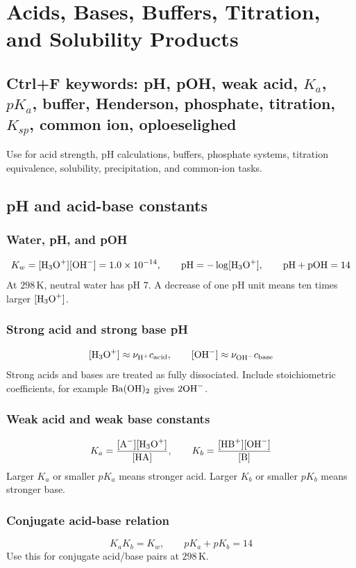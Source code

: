 \section{Acids, Bases, Buffers, Titration, and Solubility Products}

\subsection{Ctrl+F keywords: pH, pOH, weak acid, \(K_a\), \(pK_a\), buffer, Henderson, phosphate, titration, \(K_{sp}\), common ion, oploeselighed}
Use for acid strength, pH calculations, buffers, phosphate systems, titration equivalence, solubility, precipitation, and common-ion tasks.

\subsection{pH and acid-base constants}

\subsubsection{Water, pH, and pOH}
\[
K_w=[\ce{H3O+}][\ce{OH-}]=1.0\times10^{-14}, \qquad
\mathrm{pH}=-\log[\ce{H3O+}], \qquad
\mathrm{pH}+\mathrm{pOH}=14
\]
At \(298\,\mathrm K\), neutral water has pH \(7\). A decrease of one pH unit means ten times larger \([\ce{H3O+}]\).

\subsubsection{Strong acid and strong base pH}
\[
[\ce{H3O+}]\approx \nu_{\ce{H+}}c_{\mathrm{acid}}, \qquad
[\ce{OH-}]\approx \nu_{\ce{OH-}}c_{\mathrm{base}}
\]
Strong acids and bases are treated as fully dissociated. Include stoichiometric coefficients, for example \(\ce{Ba(OH)2}\) gives \(2\ce{OH-}\).

\subsubsection{Weak acid and weak base constants}
\[
K_a=\frac{[\ce{A-}][\ce{H3O+}]}{[\ce{HA}]}, \qquad
K_b=\frac{[\ce{HB+}][\ce{OH-}]}{[\ce{B}]}
\]
Larger \(K_a\) or smaller \(pK_a\) means stronger acid. Larger \(K_b\) or smaller \(pK_b\) means stronger base.

\subsubsection{Conjugate acid-base relation}
\[
K_aK_b=K_w, \qquad pK_a+pK_b=14
\]
Use this for conjugate acid/base pairs at \(298\,\mathrm K\).

